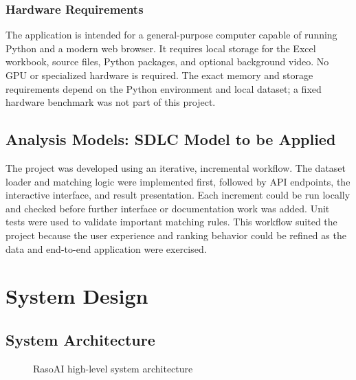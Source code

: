 \documentclass[12pt,a4paper]{report}
\begin{document}
\subsection{Hardware Requirements}
\label{subsec:hard_req}

The application is intended for a general-purpose computer capable of running Python and a modern web browser. It requires local storage for the Excel workbook, source files, Python packages, and optional background video. No GPU or specialized hardware is required. The exact memory and storage requirements depend on the Python environment and local dataset; a fixed hardware benchmark was not part of this project.

\section{Analysis Models: SDLC Model to be Applied}
\label{sec:sdlc}

The project was developed using an iterative, incremental workflow. The dataset loader and matching logic were implemented first, followed by API endpoints, the interactive interface, and result presentation. Each increment could be run locally and checked before further interface or documentation work was added. Unit tests were used to validate important matching rules. This workflow suited the project because the user experience and ranking behavior could be refined as the data and end-to-end application were exercised.

\chapter{System Design}
\label{chap:design}

\section{System Architecture}
\label{sec:architecture}

\begin{figure}[H]
\centering
{}
\caption{RasoAI high-level system architecture}
\label{fig:architecture}
\end{figure}
\end{document}
